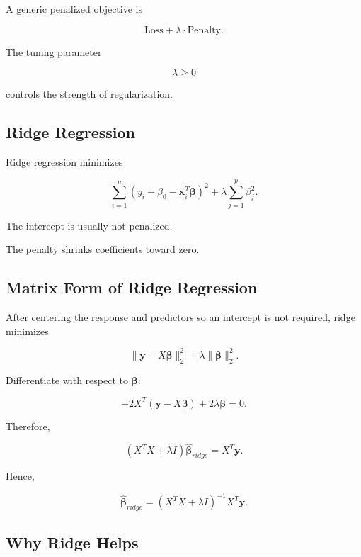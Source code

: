 A generic penalized objective is

\[
\boxed{
\text{Loss}
+
\lambda
\cdot
\text{Penalty}.
}
\]

The tuning parameter

\[
\boxed{
\lambda\geq0
}
\]

controls the strength of regularization.

\subsection{Ridge Regression}
\label{subsec:ridge-regression}

Ridge regression minimizes

\[
\boxed{
\sum_{i=1}^{n}
(
y_i
-
\beta_0
-
\mathbf{x}_i^T
\boldsymbol{\beta}
)^2
+
\lambda
\sum_{j=1}^{p}
\beta_j^2.
}
\]

The intercept is usually not penalized.

The penalty shrinks coefficients toward zero.

\subsection{Matrix Form of Ridge Regression}
\label{subsec:ridge-matrix-form}

After centering the response and predictors so an intercept is not
required, ridge minimizes

\[
\boxed{
\|
\mathbf{y}
-
X\boldsymbol{\beta}
\|_2^2
+
\lambda
\|
\boldsymbol{\beta}
\|_2^2.
}
\]

Differentiate with respect to \(\boldsymbol{\beta}\):

\[
-2X^T
(
\mathbf{y}
-
X\boldsymbol{\beta}
)
+
2\lambda
\boldsymbol{\beta}
=
0.
\]

Therefore,

\[
\boxed{
(
X^TX+\lambda I
)
\widehat{\boldsymbol{\beta}}_{ridge}
=
X^T\mathbf{y}.
}
\]

Hence,

\[
\boxed{
\widehat{\boldsymbol{\beta}}_{ridge}
=
(
X^TX+\lambda I
)^{-1}
X^T\mathbf{y}.
}
\]

\subsection{Why Ridge Helps}
\label{subsec:why-ridge-helps}

